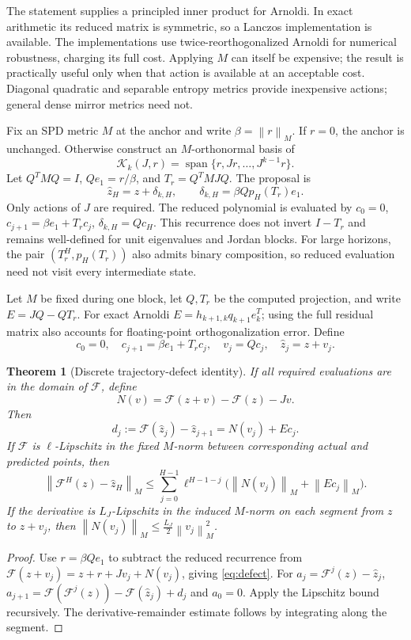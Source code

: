 \documentclass[journal]{IEEEtran}
\newtheorem{theorem}{Theorem}
\theoremstyle{definition}
\newcommand{\norm}[1]{\left\lVert#1\right\rVert}
\newcommand{\K}{\mathcal{K}}
\newcommand{\F}{\mathcal{F}}
\DeclareMathOperator{\spanop}{span}
\begin{document}
The statement supplies a principled inner product for Arnoldi. In exact
arithmetic its reduced matrix is symmetric, so a Lanczos implementation is
available. The implementations use twice-reorthogonalized Arnoldi for numerical
robustness, charging its full cost. Applying $M$ can itself be expensive;
the result is practically useful only when that action is available at an
acceptable cost. Diagonal quadratic and separable entropy metrics provide inexpensive
actions; general dense mirror metrics need not.

Fix an SPD metric $M$ at the anchor and write $\beta=\norm{r}_M$.
If $r=0$, the anchor is unchanged. Otherwise construct an $M$-orthonormal
basis of
\[
 \K_k(J,r)=\spanop\{r,Jr,\ldots,J^{k-1}r\}.
\]
Let $Q^TMQ=I$, $Qe_1=r/\beta$, and $T_r=Q^TMJQ$. The proposal is
\begin{equation}
 \widehat z_H=z+\delta_{k,H},\qquad
 \delta_{k,H}=\beta Qp_H(T_r)e_1. \label{eq:proposal}
\end{equation}
Only actions of $J$ are required. The reduced polynomial is evaluated by
$c_0=0$, $c_{j+1}=\beta e_1+T_r c_j$, $\delta_{k,H}=Qc_H$.
This recurrence does not invert $I-T_r$ and remains well-defined for unit
eigenvalues and Jordan blocks. For large horizons, the pair
$(T_r^H,p_H(T_r))$ also admits binary composition, so reduced evaluation need
not visit every intermediate state.

Let $M$ be fixed during one block, let $Q,T_r$ be the computed projection, and
write $E=JQ-QT_r$. For exact Arnoldi $E=h_{k+1,k}q_{k+1}e_k^T$; using the
full residual matrix also accounts for floating-point orthogonalization
error. Define
\[
 c_0=0,\quad c_{j+1}=\beta e_1+T_r c_j,\quad
 v_j=Qc_j,\quad \widehat z_j=z+v_j.
\]

\begin{theorem}[Discrete trajectory-defect identity]\label{thm:defect}
If all required evaluations are in the domain of $\F$, define
\[
 N(v)=\F(z+v)-\F(z)-Jv.
\]
Then
\begin{equation}
 d_j:=\F(\widehat z_j)-\widehat z_{j+1}
     =N(v_j)+Ec_j. \label{eq:defect}
\end{equation}
If $\F$ is $\ell$-Lipschitz in the fixed $M$-norm between corresponding
actual and predicted points, then
\begin{equation}
 \norm{\F^H(z)-\widehat z_H}_M
 \leq\sum_{j=0}^{H-1}\ell^{H-1-j}
       \big(\norm{N(v_j)}_M+\norm{Ec_j}_M\big). \label{eq:defectbound}
\end{equation}
If the derivative is $L_J$-Lipschitz in the induced $M$-norm on each segment
from $z$ to $z+v_j$, then $\norm{N(v_j)}_M\leq\tfrac{L_J}{2}\norm{v_j}_M^2$.
\end{theorem}
\begin{proof}
Use $r=\beta Qe_1$ to subtract the reduced recurrence from
$\F(z+v_j)=z+r+Jv_j+N(v_j)$, giving \eqref{eq:defect}.
For $a_j=\F^j(z)-\widehat z_j$,
$a_{j+1}=\F(\F^j(z))-\F(\widehat z_j)+d_j$ and $a_0=0$.
Apply the Lipschitz bound recursively. The derivative-remainder estimate
follows by integrating along the segment.
\end{proof}
\end{document}
